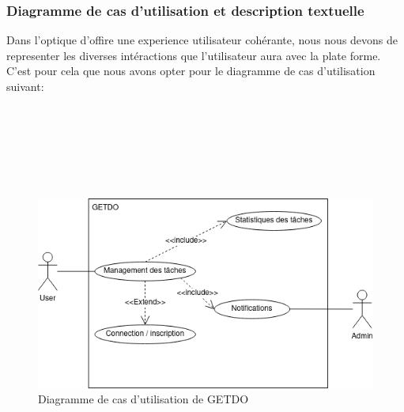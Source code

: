 \documentclass[a4paper,12pt]{report}
\begin{document}
\subsubsection{Diagramme de cas d'utilisation et description textuelle}
Dans l'optique d'offire une experience utilisateur cohérante, nous nous devons de representer les diverses intéractions que l'utilisateur aura avec la plate forme. C'est pour cela que nous avons opter pour le diagramme de cas d'utilisation suivant: \\ \\ \\ \\ \\ \\ \\

\begin{figure}[h!]
    \includegraphics[width=1\textwidth]{./images/Diagramme_useCase.drawio.png}
    \caption{Diagramme de cas d'utilisation de GETDO}
    \label{fig:GETDO_UseCaseDiagramm}
\end{figure}
\end{document}

